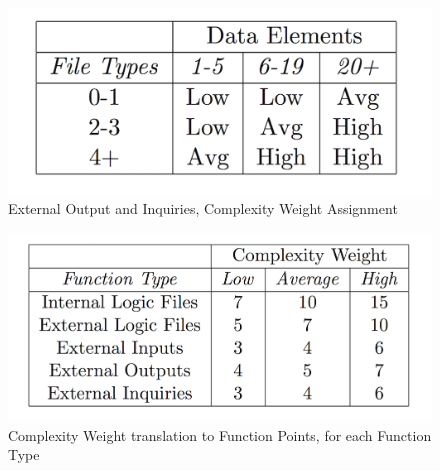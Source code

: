 \documentclass[a4paper,10pt]{article}
\begin{document}
  \begin{figure}[h]
  \centering
    \includegraphics[scale=0.46]{Resources/eoei.png}
    \caption{External Output and Inquiries, Complexity Weight Assignment}
  \end{figure}
  \begin{figure}[h]
  \centering
    \includegraphics[scale=0.46]{Resources/complwe.png}
    \caption{Complexity Weight translation to Function Points, for each Function Type}
  \end{figure}
  \FloatBarrier
\end{document}
